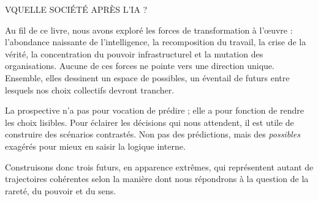 \begin{partdivider}{V}{QUELLE SOCIÉTÉ APRÈS L'IA ?}\end{partdivider}


Au fil de ce livre, nous avons exploré les forces de transformation à l'œuvre : l'abondance naissante de l'intelligence, la recomposition du travail, la crise de la vérité, la concentration du pouvoir infrastructurel et la mutation des organisations. Aucune de ces forces ne pointe vers une direction unique. Ensemble, elles dessinent un espace de possibles, un éventail de futurs entre lesquels nos choix collectifs devront trancher.

La prospective n'a pas pour vocation de prédire ; elle a pour fonction de rendre les choix lisibles. Pour éclairer les décisions qui nous attendent, il est utile de construire des scénarios contrastés. Non pas des prédictions, mais des \emph{possibles} exagérés pour mieux en saisir la logique interne.

Construisons donc trois futurs, en apparence extrêmes, qui représentent autant de trajectoires cohérentes selon la manière dont nous répondrons à la question de la rareté, du pouvoir et du sens.

